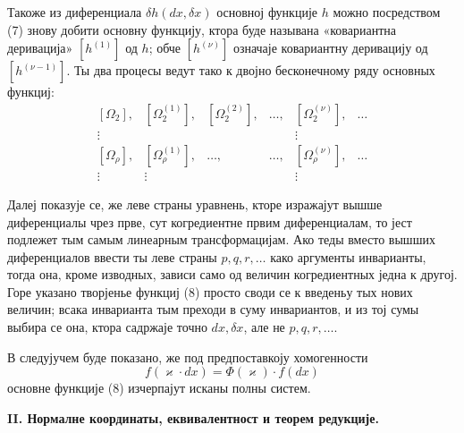 ﻿\documentclass[11pt]{article}
\begin{document}
Такоже из диференциала \(\delta h(dx,\delta x)\) основној функције \(h\) можно посредством (7) знову добити основну функцију, ктора буде называна «ковариантна деривација» \([h^{(1)}]\) од \(h\); обче \([h^{(\nu)}]\) означаје ковариантну деривацију од \([h^{(\nu-1)}]\). Ты два процесы ведут тако к двојно бесконечному ряду основных функциј:
\begin{equation}
\begin{array}{cccccc}
[\Omega_2], & [\Omega_2^{(1)}], & [\Omega_2^{(2)}], & \ldots,
& [\Omega_2^{(\nu)}], & \ldots\\
\vdots &&&& \vdots&\\
{}[\Omega_\rho], & [\Omega_\rho^{(1)}], & \ldots, & \ldots,
& [\Omega_\rho^{(\nu)}], & \ldots\\
\vdots & \vdots &&& \vdots&
\end{array}
\tag{8}
\end{equation}

Далеј показује се, же леве страны уравнень, кторе изражајут вышше диференциалы чрез прве, сут когредиентне првим диференциалам, то јест подлежет тым самым линеарным трансформацијам. Ако теды вместо вышших диференциалов ввести ты леве страны \(p,q,r,\ldots\) како аргументы инварианты, тогда она, кроме изводных, зависи само од величин когредиентных једна к другој. Горе указано творјенье функциј (8) просто своди се к введеньу тых нових величин; всака инварианта тым преходи в суму инвариантов, и из тој сумы выбира се она, ктора садржаје точно \(dx,\delta x\), але не \(p,q,r,\ldots\).

В следујучем буде показано, же под предпоставкоју хомогенности
\[
f(\varkappa\cdot dx)=\Phi(\varkappa)\cdot f(dx)
\]
основне функције (8) изчерпајут исканы полны систем.

\begin{center}
\textbf{II. Нормалне координаты, еквивалентност и теорем редукције.}
\end{center}
\end{document}
